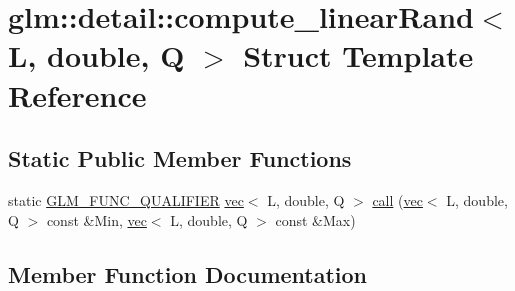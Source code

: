 \hypertarget{structglm_1_1detail_1_1compute__linear_rand_3_01_l_00_01double_00_01_q_01_4}{}\section{glm\+:\+:detail\+:\+:compute\+\_\+linear\+Rand$<$ L, double, Q $>$ Struct Template Reference}
\label{structglm_1_1detail_1_1compute__linear_rand_3_01_l_00_01double_00_01_q_01_4}
\subsection*{Static Public Member Functions}
\begin{DoxyCompactItemize}
\item 
static \mbox{\hyperlink{setup_8hpp_a33fdea6f91c5f834105f7415e2a64407}{G\+L\+M\+\_\+\+F\+U\+N\+C\+\_\+\+Q\+U\+A\+L\+I\+F\+I\+ER}} \mbox{\hyperlink{structglm_1_1vec}{vec}}$<$ L, double, Q $>$ \mbox{\hyperlink{structglm_1_1detail_1_1compute__linear_rand_3_01_l_00_01double_00_01_q_01_4_a3b4cda7d26488d79f0b78ef4d7ac728e}{call}} (\mbox{\hyperlink{structglm_1_1vec}{vec}}$<$ L, double, Q $>$ const \&Min, \mbox{\hyperlink{structglm_1_1vec}{vec}}$<$ L, double, Q $>$ const \&Max)
\end{DoxyCompactItemize}


\subsection{Member Function Documentation}
\mbox{\label{structglm_1_1detail_1_1compute__linear_rand_3_01_l_00_01double_00_01_q_01_4_a3b4cda7d26488d79f0b78ef4d7ac728e}} 
